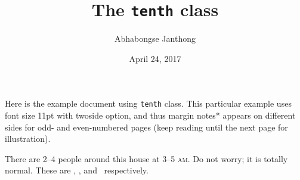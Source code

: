\documentclass[11pt,twoside]{tenth}
\title{The \texttt{tenth} class}
\author{Abhabongse Janthong}
\date{April 24, 2017}
\begin{document}
    \maketitle

    Here is the example document using \texttt{tenth} class. This particular example uses font size 11pt with twoside option, and thus margin notes*  appears on different sides for odd- and even-numbered pages (keep reading until the next page for illustration).

    \lipsum[1-5]

    There are 2--4 people around this house at 3--5 \textsc{am}.  Do not worry; it is totally normal. These are \redsq, \greensq, and \bluesq\ respectively.
\end{document}
